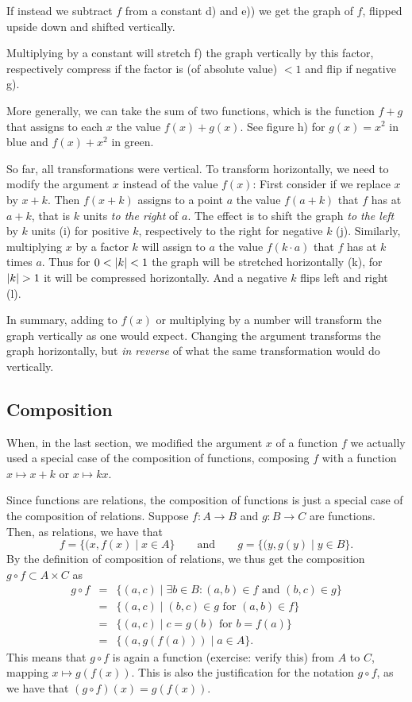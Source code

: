 If instead we subtract $f$ from a constant d) and e)) we get the graph of $f$, flipped
upside down and shifted vertically.

Multiplying by a constant will stretch f) the graph vertically by this factor, respectively
compress if the factor is (of absolute value) $<1$ and flip if negative g).
\smallskip

More generally, we can take the sum of two functions, which is the function $f+g$ that
assigns to each $x$ the value $f(x)+g(x)$. See figure h) for $g(x)=x^2$ in blue and
$f(x)+x^2$ in green.
\medskip

So far, all transformations were vertical. To transform horizontally, we need to modify
the argument $x$ instead of the value $f(x)$:
First consider if we replace $x$ by $x+k$. Then $f(x+k)$ assigns to a point $a$ the
value $f(a+k)$ that $f$ has at $a+k$, that is $k$ units {\em to the right} of $a$.
The effect is to shift the
graph {\em to the left} by $k$ units (i) for positive $k$, respectively to the right for
negative $k$ (j).
Similarly, multiplying $x$ by a factor $k$ will assign to $a$ the value $f(k\cdot a)$
that $f$ has at $k$ times $a$. Thus for $0<\left|k\right|<1$ the graph will be stretched
horizontally (k), for $\sz{k}>1$ it will be compressed horizontally. And a negative $k$
flips left and right (l).
\medskip

In summary, adding to $f(x)$ or multiplying by a number will transform the graph
vertically as one would expect. Changing the argument transforms the graph horizontally,
but {\em in reverse} of what the same transformation would do vertically.

\subsection{Composition}
\label{secfunccomposition}

When, in the last section, we modified the argument $x$ of a function $f$ we actually
used a special case of the composition of functions, composing $f$ with a function
$x\mapsto x+k$ or $x\mapsto kx$.

Since functions are relations, the composition of functions is just a special case of
the composition of relations. Suppose $f\colon A\to B$ and $g\colon B\to C$ are
functions. Then, as relations, we have that 
\[
f=\{(x,f(x)\mid x\in A\}
\qquad\mbox{and}\qquad
g=\{(y,g(y)\mid y\in B\}.
\]
By the definition of composition of relations, we thus get the composition $g\circ
f\subset A\times C$ as
\begin{eqnarray*}
g\circ f&=&\{(a,c)\mid \exists b\in B:(a,b)\in f \mbox{\ and\ }(b,c)\in g\}\\
&=&\{(a,c)\mid (b,c)\in g \mbox{\ for\ }(a,b)\in f\}\\
&=&\{(a,c)\mid c=g(b) \mbox{\ for\ }b=f(a)\}\\
&=&\{(a,g(f(a)))\mid a\in A\}.
\end{eqnarray*}
This means that $g\circ f$ is again a function (exercise: verify this) from
$A$ to $C$, mapping $x\mapsto g(f(x))$. This is also the justification for the notation
$g\circ f$, as we have that $(g\circ f)(x)=g(f(x))$.
\smallskip


